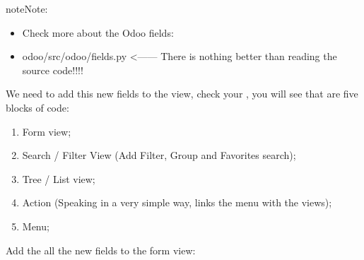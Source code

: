\documentclass[letterpaper,10pt,english]{sphinxmanual}
\begin{document}
\begin{sphinxadmonition}{note}{Note:}\begin{itemize}
\item {} 
Check more about the Odoo fields: 

\item {} 
odoo/src/odoo/fields.py \textless{}——\sphinxhyphen{} There is nothing better than reading the source code!!!!

\end{itemize}
\end{sphinxadmonition}

We need to add this new fields to the view, check your , you will see
that are five blocks of code:
\begin{enumerate}
%
\item {} 
Form view;

\item {} 
Search / Filter View (Add Filter, Group and Favorites search);

\item {} 
Tree / List view;

\item {} 
Action (Speaking in a very simple way, links the menu with the views);

\item {} 
Menu;

\end{enumerate}

Add the all the new fields to the form view:
\end{document}
